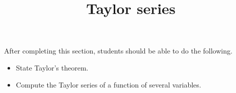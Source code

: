 \documentclass{ximera}
\title{Taylor series}
\begin{document}
\begin{abstract}
\end{abstract}

\maketitle

\begin{sectionOutcomes}

After completing this section, students should be able to do the following.

\begin{itemize}
\item State Taylor's theorem. 
\item Compute the Taylor series of a function of several variables. 
\end{itemize}

\end{sectionOutcomes}
\end{document}
